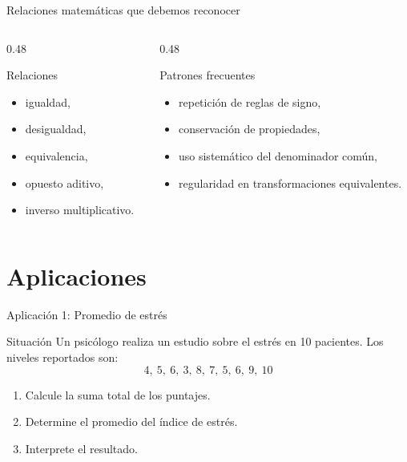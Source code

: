 \documentclass[aspectratio=169,10pt]{beamer}
\begin{document}
	\begin{frame}{Relaciones matemáticas que debemos reconocer}
		\begin{columns}[T]
			\begin{column}{0.48\textwidth}
				\begin{exampleblock}{Relaciones}
					\begin{itemize}[<+->]
						\item igualdad,
						\item desigualdad,
						\item equivalencia,
						\item opuesto aditivo,
						\item inverso multiplicativo.
					\end{itemize}
				\end{exampleblock}
			\end{column}
			
			\begin{column}{0.48\textwidth}
				\begin{block}{Patrones frecuentes}
					\begin{itemize}[<+->]
						\item repetición de reglas de signo,
						\item conservación de propiedades,
						\item uso sistemático del denominador común,
						\item regularidad en transformaciones equivalentes.
					\end{itemize}
				\end{block}
			\end{column}
		\end{columns}
	\end{frame}
	
	\section{Aplicaciones}
	
	\begin{frame}{Aplicación 1: Promedio de estrés}
		\begin{block}{Situación}
			Un psicólogo realiza un estudio sobre el estrés en 10 pacientes. Los niveles reportados son:
			\[
			4,\ 5,\ 6,\ 3,\ 8,\ 7,\ 5,\ 6,\ 9,\ 10
			\]
		\end{block}
		
		\begin{enumerate}[<+->]
			\item Calcule la suma total de los puntajes.
			\item Determine el promedio del índice de estrés.
			\item Interprete el resultado.
		\end{enumerate}
	\end{frame}
	
\end{document}
